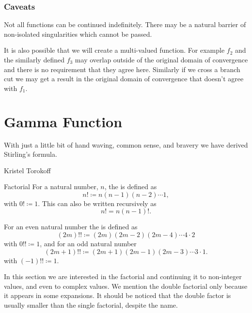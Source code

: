 \documentclass[fleqn]{NotesClass}
\begin{document}
    \subsection{Caveats}
    Not all functions can be continued indefinitely.
    There may be a natural barrier of non-isolated singularities which cannot be passed.
    
    It is also possible that we will create a multi-valued function.
    For example \(f_2\) and the similarly defined \(f_3\) may overlap outside of the original domain of convergence and there is no requirement that they agree here.
    Similarly if we cross a branch cut we may get a result in the original domain of convergence that doesn't agree with \(f_1\).
    
    \chapter{Gamma Function}
    \epigraph{With just a little bit of hand waving, common sense, and bravery we have derived Stirling's formula.}{Kristel Torokoff}
    \begin{dfn}{Factorial}{}
        For a natural number, \(n\), the  is defined as
        \begin{equation}
            n! \coloneqq n(n - 1)(n - 2) \dotsm 1,
        \end{equation}
        with \(0! \coloneqq 1\).
        This can also be written recursively as
        \begin{equation}
            n! = n(n-1)!.
        \end{equation}
        
        For an even natural number the  is defined as
        \begin{equation}
            (2m)!! \coloneqq (2m)(2m-2)(2m-4) \dotsm 4\cdot 2
        \end{equation}
        with \(0!! \coloneqq 1\), and for an odd natural number
        \begin{equation}
            (2m + 1)!! \coloneqq (2m + 1)(2m - 1)(2m - 3) \dotsm 3\cdot 1.
        \end{equation}
        with \((-1)!! \coloneqq 1\).
    \end{dfn}
    In this section we are interested in the factorial and continuing it to non-integer values, and even to complex values.
    We mention the double factorial only because it appears in some expansions.
    It should be noticed that the double factor is usually smaller than the single factorial, despite the name.
    
\end{document}
